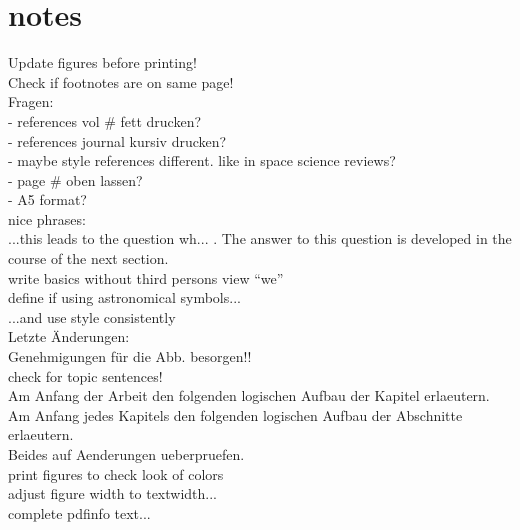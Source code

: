 
\section*{notes}

% 

Update figures before printing!\\
Check if footnotes are on same page!\\

Fragen:\\
	- references vol \# fett drucken?\\
	- references journal kursiv drucken?\\
		- maybe style references different. like in space science reviews?\\
	- page \# oben lassen?\\
	- A5 format?\\

nice phrases:\\
	...this leads to the question wh... . The answer to this question is developed in the course of the next section.\\
	
write basics without third persons view ``we''\\

define if using astronomical symbols...\\
...and use style consistently\\

Letzte Änderungen:\\
	Genehmigungen für die Abb. besorgen!!\\
	check for topic sentences!\\
	Am Anfang der Arbeit den folgenden logischen Aufbau der Kapitel erlaeutern.\\
	Am Anfang jedes Kapitels den folgenden logischen Aufbau der Abschnitte erlaeutern.\\
	Beides auf Aenderungen ueberpruefen.\\
	print figures to check look of colors\\
	adjust figure width to textwidth...\\
	complete pdfinfo text...\\

